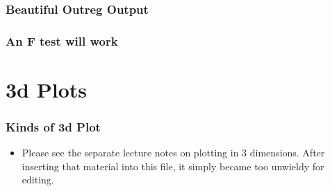 \documentclass[10pt,english]{beamer}
\def\lyxframeend{} %
\begin{document}
\begin{frame}[containsverbatim]
\frametitle{Beautiful Outreg Output}

\scriptsize{

}

\end{frame}

\begin{frame}[containsverbatim]
\frametitle{An F test will work}




\end{frame}


\lyxframeend{}\section{3d Plots}

\begin{frame}[containsverbatim]
\frametitle{Kinds of 3d Plot}
\begin{itemize}
\item Please see the separate lecture notes on plotting in 3 dimensions.
After inserting that material into this file, it simply became too
unwieldy for editing.
\end{itemize}
\end{frame}
\end{document}
